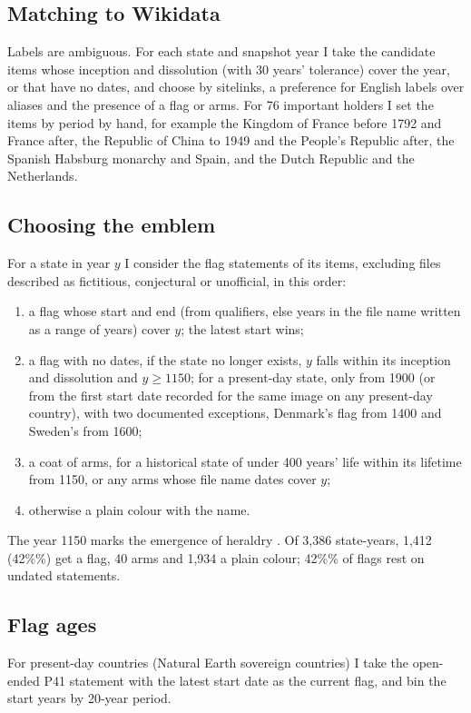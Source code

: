\documentclass[11pt,a4paper]{article}
\begin{document}
\subsection{Matching to Wikidata}
Labels are ambiguous. For each state and snapshot year I take the candidate items whose inception and dissolution (with 30 years' tolerance) cover the year, or that have no dates, and choose by sitelinks, a preference for English labels over aliases and the presence of a flag or arms. For 76 important holders I set the items by period by hand, for example the Kingdom of France before 1792 and France after, the Republic of China to 1949 and the People's Republic after, the Spanish Habsburg monarchy and Spain, and the Dutch Republic and the Netherlands.

\subsection{Choosing the emblem}
For a state in year $y$ I consider the flag statements of its items, excluding files described as fictitious, conjectural or unofficial, in this order:
\begin{enumerate}
\item a flag whose start and end (from qualifiers, else years in the file name written as a range of years) cover $y$; the latest start wins;
\item a flag with no dates, if the state no longer exists, $y$ falls within its inception and dissolution and $y \ge 1150$; for a present-day state, only from 1900 (or from the first start date recorded for the same image on any present-day country), with two documented exceptions, Denmark's flag from 1400 and Sweden's from 1600;
\item a coat of arms, for a historical state of under 400 years' life within its lifetime from 1150, or any arms whose file name dates cover $y$;
\item otherwise a plain colour with the name.
\end{enumerate}
The year 1150 marks the emergence of heraldry \citep{pastoureau}. Of 3,386 state-years, 1,412 (42\%\%) get a flag, 40 arms and 1,934 a plain colour; 42\%\% of flags rest on undated statements.

\subsection{Flag ages}
For present-day countries (Natural Earth sovereign countries) I take the open-ended P41 statement with the latest start date as the current flag, and bin the start years by 20-year period.
\end{document}

